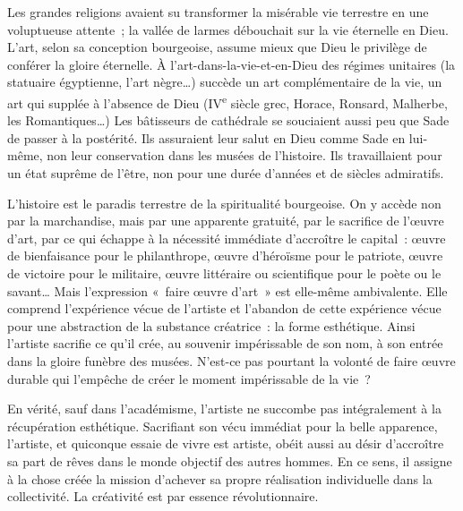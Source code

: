 \documentclass[french,twoside]{book} %
\newcommand{\astermono}{\medskip\centerline{\color{rubric}\large\selectfont{\syms ✻}}\medskip\par}%
\begin{document}
\astermono

\noindent Les grandes religions avaient su transformer la misérable vie terrestre en une voluptueuse attente ; la vallée de larmes débouchait sur la vie éternelle en Dieu. L’art, selon sa conception bourgeoise, assume mieux que Dieu le privilège de conférer la gloire éternelle. À l’art-dans-la-vie-et-en-Dieu des régimes unitaires (la statuaire égyptienne, l’art nègre…) succède un art complémentaire de la vie, un art qui supplée à l’absence de Dieu (IV\textsuperscript{e} siècle grec, Horace, Ronsard, Malherbe, les Romantiques…) Les bâtisseurs de cathédrale se souciaient aussi peu que Sade de passer à la postérité. Ils assuraient leur salut en Dieu comme Sade en lui-même, non leur conservation dans les musées de l’histoire. Ils travaillaient pour un état suprême de l’être, non pour une durée d’années et de siècles admiratifs.\par
L’histoire est le paradis terrestre de la spiritualité bourgeoise. On y accède non par la marchandise, mais par une apparente gratuité, par le sacrifice de l’œuvre d’art, par ce qui échappe à la nécessité immédiate d’accroître le capital : œuvre de bienfaisance pour le philanthrope, œuvre d’héroïsme pour le patriote, œuvre de victoire pour le militaire, œuvre littéraire ou scientifique pour le poète ou le savant… Mais l’expression « faire œuvre d’art » est elle-même ambivalente. Elle comprend l’expérience vécue de l’artiste et l’abandon de cette expérience vécue pour une abstraction de la substance créatrice : la forme esthétique. Ainsi l’artiste sacrifie ce qu’il crée, au souvenir impérissable de son nom, à son entrée dans la gloire funèbre des musées. N’est-ce pas pourtant la volonté de faire œuvre durable qui l’empêche de créer le moment impérissable de la vie ?\par
En vérité, sauf dans l’académisme, l’artiste ne succombe pas intégralement à la récupération esthétique. Sacrifiant son vécu immédiat pour la belle apparence, l’artiste, et quiconque essaie de vivre est artiste, obéit aussi au désir d’accroître sa part de rêves dans le monde objectif des autres hommes. En ce sens, il assigne à la chose créée la mission d’achever sa propre réalisation individuelle dans la collectivité. La créativité est par essence révolutionnaire.\par
\end{document}
